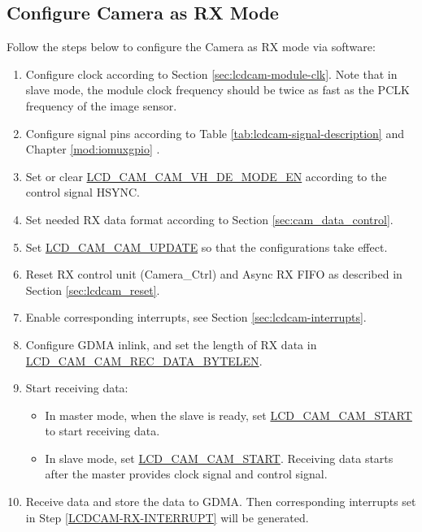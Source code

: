 \documentclass[main\_\_EN.tex]{subfiles}
\begin{document}
\subsection{Configure Camera as RX Mode}

Follow the steps below to configure the Camera as RX mode via software:

\begin{enumerate}
    \item Configure clock according to Section \ref{sec:lcdcam-module-clk}. Note that in slave mode, the module clock frequency should be twice as fast as the PCLK frequency of the image sensor.

    \item Configure signal pins according to Table \ref{tab:lcdcam-signal-description} and Chapter \ref{mod:iomuxgpio} \textit{}.

    \item Set or clear  \hyperref[fielddesc:LCDCAMCAMVHDEMODEEN]{LCD\_CAM\_CAM\_VH\_DE\_MODE\_EN} according to the control signal HSYNC.

    \item Set needed RX data format according to Section \ref{sec:cam_data_control}.
    \item Set \hyperref[fielddesc:LCDCAMCAMUPDATE]{LCD\_CAM\_CAM\_UPDATE} so that the configurations take effect.

    \item Reset RX control unit (Camera\_Ctrl) and Async RX FIFO as described in Section \ref{sec:lcdcam_reset}.
    \item Enable corresponding interrupts, see Section  \ref{sec:lcdcam-interrupts}.\label{LCDCAM-RX-INTERRUPT}

    \item Configure GDMA inlink, and set the length of RX data in \hyperref[fielddesc:LCDCAMCAMRECDATABYTELEN]{LCD\_CAM\_CAM\_REC\_DATA\_BYTELEN}.

    \item Start receiving data:
    \begin{itemize}
        \item In master mode, when the slave is ready, set \hyperref[fielddesc:LCDCAMCAMSTART]{LCD\_CAM\_CAM\_START} to start receiving data.
        \item In slave mode, set \hyperref[fielddesc:LCDCAMCAMSTART]{LCD\_CAM\_CAM\_START}. Receiving data starts after the master provides clock signal and control signal.
    \end{itemize}
    \item Receive data and store the data to GDMA. Then corresponding interrupts set in Step \ref{LCDCAM-RX-INTERRUPT} will be generated.

\end{enumerate}
\end{document}
